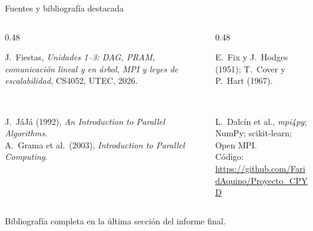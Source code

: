 \documentclass[10pt, aspectratio=169]{beamer}
\newcommand{\cajaInfo}[2]{%
  {\setlength{\fboxsep}{6pt}%
   \colorbox{UTECDarkBlue!5}{\begin{minipage}{\dimexpr#1-2\fboxsep\relax}#2\end{minipage}}}%
}
\newcommand{\cajaAcento}[2]{%
  {\setlength{\fboxsep}{6pt}%
   \colorbox{UTECCyan!10}{\begin{minipage}{\dimexpr#1-2\fboxsep\relax}#2\end{minipage}}}%
}
\newcommand{\encCaja}[1]{\textbf{\color{UTECDarkBlue}{#1}}\par\vspace{0.08cm}}
\begin{document}
\begin{frame}{Fuentes y bibliografía destacada}
\footnotesize
\vspace{0.2cm}
\begin{columns}[T,onlytextwidth]
    \begin{column}{0.48\textwidth}
        \cajaInfo{\linewidth}{%
            \encCaja{Base teórica}
            J.~Fiestas, \emph{Unidades 1--3: DAG, PRAM, comunicación lineal y en árbol, MPI y leyes
            de escalabilidad}, CS4052, UTEC, 2026.
        }\\[0.2cm]
        \cajaInfo{\linewidth}{%
            \encCaja{Algoritmos paralelos}
            J.~JáJá (1992), \emph{An Introduction to Parallel Algorithms}.\\
            A.~Grama et al.\ (2003), \emph{Introduction to Parallel Computing}.
        }
    \end{column}
    \begin{column}{0.48\textwidth}
        \cajaAcento{\linewidth}{%
            \encCaja{KNN}
            E.~Fix y J.~Hodges (1951); T.~Cover y P.~Hart (1967).
        }\\[0.2cm]
        \cajaAcento{\linewidth}{%
            \encCaja{Herramientas}
            L.~Dalcín et al., \emph{mpi4py}; NumPy; scikit-learn; Open MPI.\\
            Código: \url{https://github.com/FaridAquino/Proyecto_CPYD}
        }
    \end{column}
\end{columns}
\vspace{0.3cm}
\begin{center}
{\scriptsize\color{UTECGray}Bibliografía completa en la última sección del informe final.}
\end{center}
\end{frame}
\end{document}
